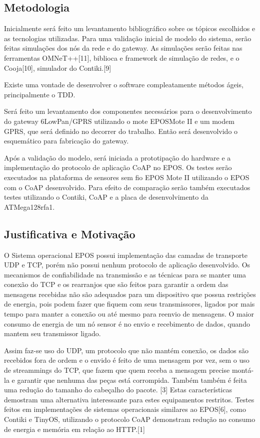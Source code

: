 \subsection{Metodologia}

Inicialmente será feito um levantamento bibliográfico sobre os tópicos escolhidos e as tecnologias utilizadas. Para uma validação inicial de modelo do sistema, serão feitas simulações dos nós da rede e do gateway. As simulações serão feitas nas ferramentas OMNeT++[11], biblioca e framework de simulação de redes, e o Cooja[10], simulador do Contiki.[9]

Existe uma vontade de desenvolver o software compleatamente métodos ágeis, principalmente o TDD.

Será feito um levantamento dos componentes necessários para o desenvolvimento do gateway 6LowPan/GPRS utilizando o mote EPOSMote II e um modem GPRS, que será definido no decorrer do trabalho. Então será desenvolvido o esquemático para fabricação do gateway.

Após a validação do modelo, será iniciada a prototipação do hardware e a implementação do protocolo de aplicação CoAP no EPOS. Os testes serão executados na plataforma de sensores sem fio EPOS Mote II utilizando o EPOS com o CoAP desenvolvido. Para efeito de comparação serão também executados testes utilizando o Contiki, CoAP e a placa de desenvolvimento da ATMega128rfa1.

\subsection{Justificativa e Motivação}

O Sistema operacional EPOS possui implementação das camadas de transporte UDP e TCP, porém não possui nenhum protocolo de aplicação desenvolvido.
Os mecanismos de confiabilidade na transmissão e as técnicas para se manter uma conexão do TCP e os rearranjos que são feitos para garantir a ordem das mensagens recebidas não são adequados para um dispositivo que possua restrições de energia, pois podem fazer que fiquem com seus transmissores, ligados por mais tempo para manter a conexão ou até mesmo para reenvio de mensagens. O maior consumo de energia de um nó sensor é no envio e recebimento de dados, quando mantem seu transmissor ligado.

Assim faz-se uso do UDP, um protocolo que não mantém conexão, os dados são recebidos fora de ordem e o envido é feito de uma mensagem por vez, sem o uso de streammings do TCP, que fazem que quem receba a mensagem precise montá-la e garantir que nenhuma das peças está corrompida. Também também é feita uma redução do tamanho do cabeçalho do pacote. [3] Estas características demostram uma alternativa interessante para estes equipamentos restritos. Testes feitos em implementações de sistemas operacionais similares ao EPOS[6], como Contiki e TinyOS, utilizando o protocolo CoAP demonstram redução no consumo de energia e memória em relação ao HTTP.[1]

